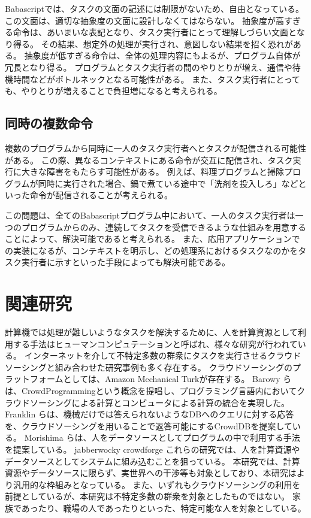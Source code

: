 Babascriptでは、タスクの文面の記述には制限がないため、自由となっている。
この文面は、適切な抽象度の文面に設計しなくてはならない。
抽象度が高すぎる命令は、あいまいな表記となり、タスク実行者にとって理解しづらい文面となり得る。
その結果、想定外の処理が実行され、意図しない結果を招く恐れがある。
抽象度が低すぎる命令は、全体の処理内容にもよるが、プログラム自体が冗長となり得る。
プログラムとタスク実行者の間のやりとりが増え、通信や待機時間などがボトルネックとなる可能性がある。
また、タスク実行者にとっても、やりとりが増えることで負担増になると考えられる。

\subsection{同時の複数命令}\label{ux540cux6642ux306eux8907ux6570ux547dux4ee4}

複数のプログラムから同時に一人のタスク実行者へとタスクが配信される可能性がある。
この際、異なるコンテキストにある命令が交互に配信され、タスク実行に大きな障害をもたらす可能性がある。
例えば、料理プログラムと掃除プログラムが同時に実行された場合、鍋で煮ている途中で「洗剤を投入しろ」などといった命令が配信されることが考えられる。

この問題は、全てのBabascriptプログラム中において、一人のタスク実行者は一つのプログラムからのみ、連続してタスクを受信できるような仕組みを用意することによって、解決可能であると考えられる。
また、応用アプリケーションでの実装になるが、コンテキストを明示し、どの処理系におけるタスクなのかをタスク実行者に示すといった手段によっても解決可能である。

\section{関連研究}\label{ux95a2ux9023ux7814ux7a76}

計算機では処理が難しいようなタスクを解決するために、人を計算資源として利用する手法はヒューマンコンピュテーション\cite{HumanComputation}と呼ばれ、様々な研究が行われている。
インターネットを介して不特定多数の群衆にタスクを実行させるクラウドソーシングと組み合わせた研究事例も多く存在する。
クラウドソーシングのプラットフォームとしては、Amazon Mechanical
Turk\cite{mechanicalturk}が存在する。 Barowy
らは、CrowdProgrammingという概念を提唱し、プログラミング言語内においてクラウドソーシングによる計算とコンピュータによる計算の統合を実現した\cite{automan}。
Franklin
らは、機械だけでは答えられないようなDBへのクエリに対する応答を、クラウドソーシングを用いることで返答可能にするCrowdDBを提案している\cite{crowddb}。
Morishima
らは、人をデータソースとしてプログラムの中で利用する手法を提案している\cite{cylog}。
jabberwocky crowdforge
これらの研究では、人を計算資源やデータソースとしてシステムに組み込むことを狙っている。
本研究では、計算資源やデータソースに限らず、実世界への干渉等も対象としており、本研究はより汎用的な枠組みとなっている。
また、いずれもクラウドソーシングの利用を前提としているが、本研究は不特定多数の群衆を対象としたものではない。
家族であったり、職場の人であったりといった、特定可能な人を対象としている。

